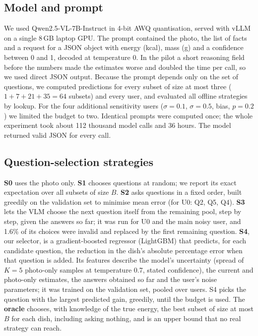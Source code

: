 \documentclass[twocolumn]{svjour3}
\begin{document}
\subsection{Model and prompt}
We used Qwen2.5-VL-7B-Instruct in 4-bit AWQ quantisation, served with vLLM on a single 8\,GB laptop GPU.
The prompt contained the photo, the list of facts and a request for a JSON object with energy (kcal), mass
(g) and a confidence between 0 and 1, decoded at temperature 0. In the pilot a short reasoning field before
the numbers made the estimates worse and doubled the time per call, so we used direct JSON output. Because
the prompt depends only on the set of questions, we computed predictions for every subset of size at most
three ($1+7+21+35=64$ subsets) and every user, and evaluated all offline strategies by lookup. For the four
additional sensitivity users ($\sigma=0.1$, $\sigma=0.5$, bias, $p=0.2$) we limited the budget to two. Identical prompts were computed once; the
whole experiment took about 112 thousand model calls and 36 hours. The model returned valid JSON for every
call.

\subsection{Question-selection strategies}
\textbf{S0} uses the photo only. \textbf{S1} chooses questions at random; we report its exact expectation
over all subsets of size $B$. \textbf{S2} asks questions in a fixed order, built greedily on the validation
set to minimise mean error (for U0: Q2, Q5, Q4). \textbf{S3} lets the VLM choose the next question itself
from the remaining pool, step by step, given the answers so far; it was run for U0 and the main noisy user,
and 1.6\% of its choices were invalid and replaced by the first remaining question. \textbf{S4}, our
selector, is a gradient-boosted regressor (LightGBM) that predicts, for each candidate question, the
reduction in the dish's absolute percentage error when that question is added. Its features describe the
model's uncertainty (spread of $K=5$ photo-only samples at temperature 0.7, stated confidence), the current
and photo-only estimates, the answers obtained so far and the user's noise parameters; it was trained on
the validation set, pooled over users. S4 picks the question with the largest predicted gain, greedily,
until the budget is used. The \textbf{oracle} chooses, with knowledge of the true energy, the best subset of
size at most $B$ for each dish, including asking nothing, and is an upper bound that no real strategy can
reach.
\end{document}
